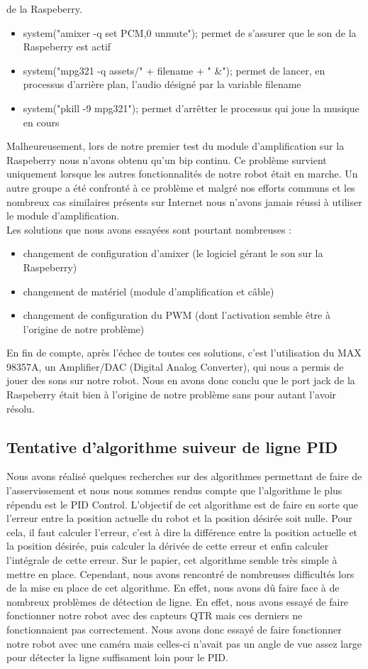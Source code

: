 \documentclass[a4paper, 12pt]{report}
\begin{document}
de la Raspeberry.
\begin{itemize}
    \item system("amixer -q set PCM,0 unmute"); permet de s'assurer que le son de la Raspeberry est actif
    \item system("mpg321 -q assets/" + filename + " \&"); permet de lancer, en processus d'arrière plan, l'audio désigné par la variable filename
    \item system("pkill -9 mpg321"); permet d'arrêtter le processus qui joue la musique en cours
\end{itemize}
Malheureusement, lors de notre premier test du module d'amplification sur la Raspeberry nous n'avons obtenu qu'un bip continu. Ce problème survient uniquement lorsque les autres fonctionnalités  de notre robot était en marche. Un autre groupe a été confronté à ce problème et malgré nos efforts communs et les nombreux cas similaires présents sur Internet nous n'avons jamais réussi à utiliser le module d'amplification.
\\
Les solutions que nous avons essayées sont pourtant nombreuses :
\begin{itemize}
    \item changement de configuration d'amixer (le logiciel gérant le son sur la Raspeberry)
    \item changement de matériel (module d'amplification et câble)
    \item changement de configuration du PWM (dont l'activation semble être à l'origine de notre problème)
\end{itemize}
En fin de compte, après l'échec de toutes ces solutions, c'est l'utilisation du MAX 98357A, un Amplifier/DAC (Digital Analog Converter), qui nous a permis de jouer des sons sur notre robot. Nous en avons donc conclu que le port jack de la Raspeberry était bien à l'origine de notre problème sans pour autant l'avoir résolu.

\subsection{Tentative d'algorithme suiveur de ligne PID}
Nous avons réalisé quelques recherches sur des algorithmes permettant de faire de l'asservissement et nous nous sommes rendus compte que l'algorithme le plus répendu est le PID Control.
L'objectif de cet algorithme est de faire en sorte que l'erreur entre la position actuelle du robot et la position désirée soit nulle. Pour cela, il faut calculer l'erreur, c'est à dire la différence entre la position actuelle et la position désirée, puis calculer la dérivée de cette erreur et enfin calculer l'intégrale de cette erreur.
Sur le papier, cet algorithme semble très simple à mettre en place. Cependant, nous avons rencontré de nombreuses difficultés lors de la mise en place de cet algorithme.
En effet, nous avons dû faire face à de nombreux problèmes de détection de ligne. En effet, nous avons essayé de faire fonctionner notre robot avec des capteurs QTR mais ces derniers ne fonctionnaient pas correctement. Nous avons donc essayé de faire fonctionner notre robot avec une caméra mais celles-ci n'avait pas un angle de vue assez large pour détecter la ligne suffisament loin pour le PID.
\end{document}
